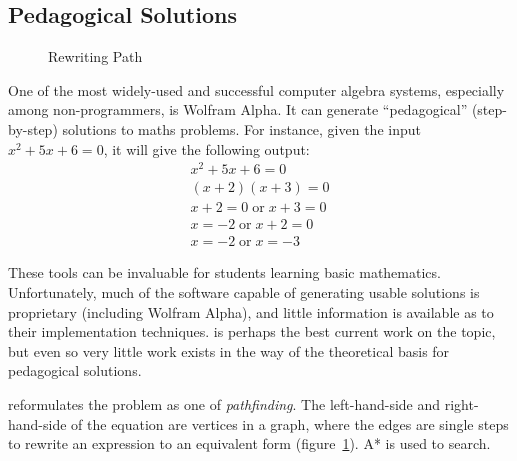 \documentclass[draft, twocolumn]{article}
\theoremstyle{definition}
\theoremstyle{definition}
\begin{document}
\subsection{Pedagogical Solutions} \label{pedagogical}
\begin{figure}[t]
  \centering
  \caption{Rewriting Path}
  \label{rewrite-graph}
\end{figure}
One of the most widely-used and successful computer algebra systems, especially
among non-programmers, is Wolfram
Alpha\cite{wolfram_research_inc._wolframalpha_2019}. It can generate
``pedagogical'' (step-by-step) solutions to maths
problems\cite{the_development_team_step-by-step_2009}. For instance, given the
input \(x^2 + 5 x + 6 = 0\), it will give the following output:
\begin{align*}
  x^2 + 5x + 6   = 0 \\
  (x + 2)(x + 3) = 0 \\
  x + 2 = 0   \; \text{or} \; x + 3 = 0 \\
  x     = -2  \; \text{or} \; x + 2 = 0 \\
  x     = -2  \; \text{or} \; x     = -3
\end{align*}

These tools can be invaluable for students learning basic mathematics.
Unfortunately, much of the software capable of generating usable solutions is
proprietary (including Wolfram Alpha), and little information is available as to
their implementation techniques.\cite{lioubartsev_constructing_2016} is perhaps
the best current work on the topic, but even so very little work exists in the
way of the theoretical basis for pedagogical solutions.

\cite{lioubartsev_constructing_2016} reformulates the problem as one of
\emph{pathfinding}. The left-hand-side and right-hand-side of the equation are
vertices in a graph, where the edges are single steps to rewrite an expression
to an equivalent form (figure~\ref{rewrite-graph}). A* is used to search.
\end{document}

